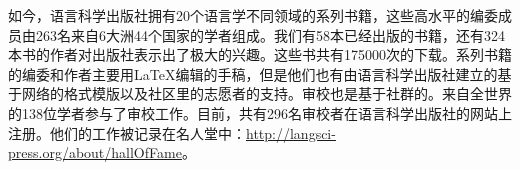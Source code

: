 
如今，语言科学出版社拥有20个语言学不同领域的系列书籍，这些高水平的编委成员由263名来自6大洲44个国家的学者组成。我们有58本已经出版的书籍，还有324本书的作者对出版社表示出了极大的兴趣。这些书共有175000次的下载。系列书籍的编委和作者主要用\LaTeX{}编辑的手稿，但是他们也有由语言科学出版社建立的基于网络的格式模版以及社区里的志愿者的支持。审校也是基于社群的。来自全世界的138位学者参与了审校工作。目前，共有296名审校者在语言科学出版社的网站上注册。他们的工作被记录在名人堂中：\url{http://langsci-press.org/about/hallOfFame}。

